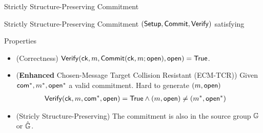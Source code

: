 \begin{frame}{Strictly Structure-Preserving Commitment~\cite{DBLP:conf/eurocrypt/AbeKOT15}}

  Strictly Structure-Preserving Commitment $({\mathsf{Setup}}, {\mathsf{Commit}}, {\mathsf{Verify}})$ satisfying \pause
  \begin{block}{Properties}
    \begin{itemize}
    \item {\color{blue}(Correctness)} ${\mathsf{Verify}}(\mathsf{ck}, m, {\mathsf{Commit}}(\mathsf{ck}, m; \mathsf{open}), \mathsf{open}) = \mathsf{True}$.
      \pause
    \item {\color{blue}(\textbf{Enhanced} Chosen-Message Target Collision Resistant (ECM-TCR))} Given $\mathsf{com}^*, m^*, \mathsf{open}^*$ a valid commitment. Hard to generate $(m, \mathsf{open})$ \st
      \begin{align*}
        {\mathsf{Verify}}(\mathsf{ck}, m, \mathsf{com}^*, \mathsf{open}) &= \mathsf{True} \wedge (m, \mathsf{open}) \neq (m^*, \mathsf{open}^*)
      \end{align*}
    \item {\color{blue}(Stricly Structure-Preserving)} The commitment is also in the source group $\mathbb{G}$ or $\hat{\mathbb{G}}$.
    \end{itemize}
  \end{block}
\end{frame}


